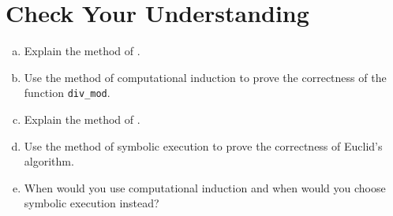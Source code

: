 \section{Check Your Understanding}
\begin{enumerate}[(a)]
\item Explain the method of .
\item Use the method of computational induction to prove the correctness of the function \texttt{div\_mod}.
\item Explain the method of .
\item Use the method of symbolic execution to prove the correctness of Euclid's algorithm.
\item When would you use computational induction and when would you choose symbolic execution instead?
\end{enumerate}


